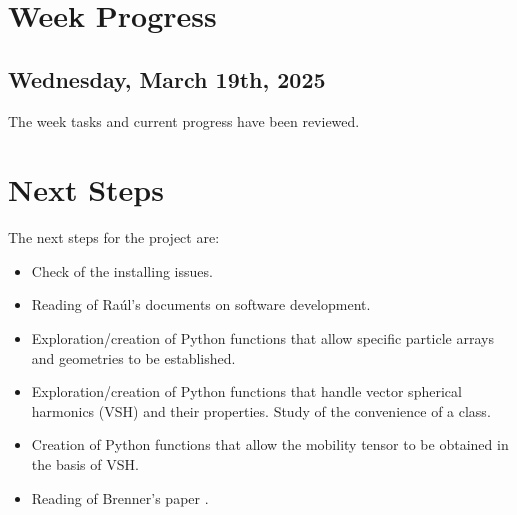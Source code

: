\documentclass[12pt]{article}
\begin{document}
\section{Week Progress}

\subsection{Wednesday, March 19th, 2025}
The week tasks and current progress have been reviewed. 


\section{Next Steps}
The next steps for the project are:
\begin{itemize}
    \item Check of the  installing issues.
    \item Reading of Raúl's documents on software development.
    \item Exploration/creation of Python functions that allow specific particle arrays and geometries to be established.
    \item Exploration/creation of Python functions that handle vector spherical harmonics (VSH) and their properties. Study of the convenience of a class.
    \item Creation of Python functions that allow the mobility tensor to be obtained in the basis of VSH.
    \item Reading of Brenner's paper \cite{BRENNER1961242}.
\end{itemize}

\printbibliography
\end{document}

